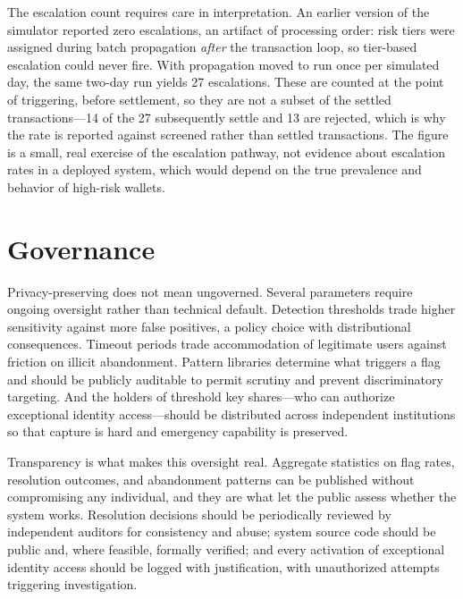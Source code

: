 \documentclass[11pt]{article}
\begin{document}
The escalation count requires care in interpretation. An earlier version of the simulator reported
zero escalations, an artifact of processing order: risk tiers were assigned during batch propagation
\emph{after} the transaction loop, so tier-based escalation could never fire. With propagation moved
to run once per simulated day, the same two-day run yields 27 escalations. These are counted at the
point of triggering, before settlement, so they are not a subset of the settled transactions---14 of
the 27 subsequently settle and 13 are rejected, which is why the rate is reported against screened
rather than settled transactions. The figure is a small, real exercise of the escalation pathway, not
evidence about escalation rates in a deployed system, which would depend on the true prevalence and
behavior of high-risk wallets.
\section{Governance}
\label{sec:governance}

Privacy-preserving does not mean ungoverned. Several parameters require ongoing oversight rather than
technical default. Detection thresholds trade higher sensitivity against more false positives, a
policy choice with distributional consequences. Timeout periods trade accommodation of legitimate
users against friction on illicit abandonment. Pattern libraries determine what triggers a flag and
should be publicly auditable to permit scrutiny and prevent discriminatory targeting. And the
holders of threshold key shares---who can authorize exceptional identity access---should be
distributed across independent institutions so that capture is hard and emergency capability is
preserved.

Transparency is what makes this oversight real. Aggregate statistics on flag rates, resolution
outcomes, and abandonment patterns can be published without compromising any individual, and they
are what let the public assess whether the system works. Resolution decisions should be periodically
reviewed by independent auditors for consistency and abuse; system source code should be public and,
where feasible, formally verified; and every activation of exceptional identity access should be
logged with justification, with unauthorized attempts triggering investigation.
\end{document}
